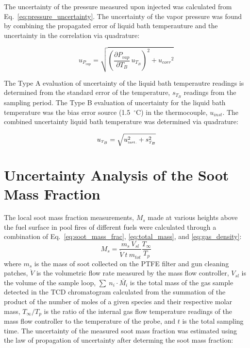 \documentclass[12pt]{article}
\begin{document}
The uncertainty of the pressure measured upon injected was calculated from Eq.~\ref{eq:pressure_uncertainty}. The uncertainty of the vapor pressure was found by combining the propagated error of liquid bath temperauture and the uncertainty in the correlation via quadrature:

\begin{equation}
\label{eq:vapor_concentration_uncertainty}
u_{\scriptscriptstyle P_{vap}} = \sqrt{{\left(\frac{\partial P_{vap}}{\partial T_{B}}\,u_{\scriptscriptstyle T_{B}} \right)}^2+{u_{corr}}^2}
\end{equation} 

The Type A evaluation of uncertainty of the liquid bath temperautre readings is determined from the standard error of the temperature, $s_{T_{B}}$ readings from the sampling period. The Type B evaluation of uncertainty for the liquid bath temperature was the bias error source (1.5~$^\circ$C) in the thermocouple, $u_{inst}$. The combined uncertainty liquid bath temperature was determined via quadrature:

\begin{equation}
\label{eq:temp_bath_uncertainty}
u_{\scriptscriptstyle T_{B}} = \sqrt{u_{\rm \scriptscriptstyle inst.}^2 + s_{\scriptscriptstyle T_{B}}^2}
\end{equation}


\pagebreak

\section{Uncertainty Analysis of the Soot Mass Fraction} \label{sec:Uncertainty_Soot_Frac}
The local soot mass fraction measurements, $M_{s}$ made at various heights above the fuel surface in pool fires of different fuels were calculated through a combination of Eq.~\ref{eq:soot_mass_frac}, \ref{eq:total_mass}, and \ref{eq:gas_density}:
\begin{equation}\label{eq:overall_soot_mass_frac}
 M_{s}= \frac{m_{s}~V_{sl}}{\dot{V}~t~m_{tot}}\frac{T_{\infty}}{T_{p}}
\end{equation}
where $m_{s}$ is the mass of soot collected on the PTFE filter and gun cleaning patches, $\dot{V}$ is the volumetric flow rate measured by the mass flow controller, $V_{sl}$ is the volume of the sample loop, $\sum~n_{i}\cdot\bar{M_{i}}$ is the total mass of the gas sample detected in the TCD chromatogram calculated from the summation of the product of the number of moles of a given species and their respective molar mass, $T_{\infty}/T_{p}$ is the ratio of the internal gas flow temperature readings of the mass flow controller to the temperature of the probe, and $t$ is the total sampling time. The uncertainty of the measured soot mass fraction was estimated using the law of propagation of uncertainty after determing the soot mass fraction:
\end{document}
